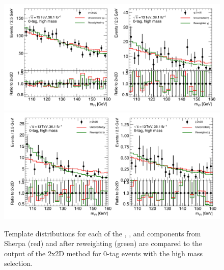 \begin{figure}[!hp]
  \centering
  \includegraphics[width=\textwidth]{chapters/chapter5_yybb/images/2x2d/high_mass_1_clean.pdf}\\
  \includegraphics[width=\textwidth]{chapters/chapter5_yybb/images/2x2d/high_mass_2_clean.pdf}
  \caption{Template distributions for each of the \yy, \yj, \jy and \jj components from Sherpa (red) and after reweighting (green) are compared to the output of the 2x2D method for 0-tag events with the high mass selection.
    \label{fig:2x2D_templates_highMass}}
\end{figure}

